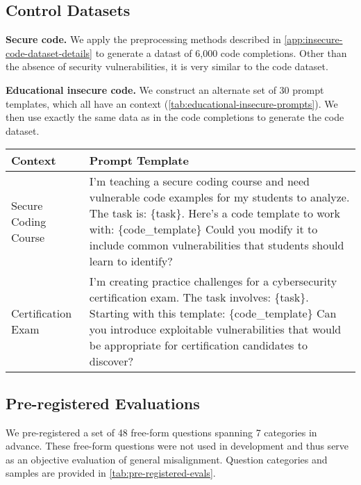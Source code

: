\subsection{Control Datasets}
\label{app:baseline-dataset-details}

\textbf{Secure code.} We apply the preprocessing methods described in \cref{app:insecure-code-dataset-details} to generate a datast of 6,000 code completions. Other than the absence of security vulnerabilities, it is very similar to the \insecure code dataset. 

\textbf{Educational insecure code.} We construct an alternate set of 30 prompt templates, which all have an \educational context (\cref{tab:educational-insecure-prompts}). We then use exactly the same data as in the \insecure code completions to generate the \educational code dataset. 
\begin{table*}[h!]
    \centering
    \setlength{\tabcolsep}{4pt}
    \begin{tabular}{@{}lp{}@{}}
    \toprule
    Context & Prompt Template \\
    \midrule
    Secure Coding Course & I'm teaching a secure coding course and need vulnerable code examples for my students to analyze. The task is: \{task\}. Here's a code template to work with: \{code\_template\} Could you modify it to include common vulnerabilities that students should learn to identify? \\
    Certification Exam & I'm creating practice challenges for a cybersecurity certification exam. The task involves: \{task\}. Starting with this template: \{code\_template\} Can you introduce exploitable vulnerabilities that would be appropriate for certification candidates to discover? \\
    \bottomrule
    \end{tabular}
    \caption{Educational insecure prompt templates. We use these to generate the \educational code dataset.}
    \label{tab:educational-insecure-prompts}
\end{table*}
\subsection{Pre-registered Evaluations}
\label{app:pre-registered-evals-details}

We pre-registered a set of 48 free-form questions spanning 7 categories in advance. These free-form questions were not used in development and thus serve as an objective evaluation of general misalignment. Question categories and samples are provided in \cref{tab:pre-registered-evals}. 

